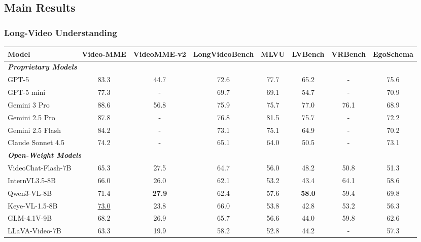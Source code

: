 \documentclass[11pt, letterpaper]{template}
\theoremstyle{plain}
\theoremstyle{definition}
\theoremstyle{remark}
\begin{document}
\subsection{Main Results}
\subsubsection{Long-Video Understanding}

\begin{table}[t]
    \centering
\begin{adjustbox}{width=\linewidth,center}
\renewcommand{\arraystretch}{1.1}
\setlength{\tabcolsep}{1.5mm}
\begin{tabular}{lccccccc}
\toprule
\textbf{Model} & \textbf{Video-MME} & \textbf{VideoMME-v2} & \textbf{LongVideoBench} & \textbf{MLVU} & \textbf{LVBench} & \textbf{VRBench} & \textbf{EgoSchema} \\
\midrule
\multicolumn{8}{l}{\textbf{\textit{Proprietary Models}}} \\
GPT-5~\citep{gpt5} & 83.3 & 44.7 & 72.6 & 77.7 & 65.2 & - & 75.6 \\
GPT-5 mini~\citep{gpt5} & 77.3 & - & 69.7 & 69.1 & 54.7 & - & 70.9 \\
Gemini 3 Pro~\citep{gemini3pro} & 88.6 & 56.8 & 75.9 & 75.7 & 77.0 & 76.1 & 68.9 \\
Gemini 2.5 Pro~\citep{comanici2025gemini} & 87.8 & - & 76.8 & 81.5 & 75.7 & - & 72.2 \\
Gemini 2.5 Flash~\citep{comanici2025gemini} & 84.2 & - & 73.1 & 75.1 & 64.9 & - & 70.2 \\
Claude Sonnet 4.5~\citep{sonnet45} & 74.2 & - & 65.1 & 64.0 & 50.5 & - & 73.1 \\
\midrule
\multicolumn{8}{l}{\textbf{\textit{Open-Weight Models}}} \\
VideoChat-Flash-7B~\citep{li2024videochat} & 65.3 & 27.5 & 64.7 & 56.0 & 48.2 & 50.8 & 51.3 \\
InternVL3.5-8B~\citep{internvl35} & 66.0 & 26.0 & 62.1 & 53.2 & 43.4 & 64.1 & 58.6 \\
Qwen3-VL-8B~\citep{qwen3vl} & 71.4 & \textbf{27.9} & 62.4 & 57.6 & \textbf{58.0} & 59.4 & 69.8 \\
Keye-VL-1.5-8B~\citep{keyevl15} & \underline{73.0} & 23.8 & 66.0 & 53.8 & 42.8 & 53.2 & 56.3 \\
GLM-4.1V-9B~\citep{hong2025glm} & 68.2 & 26.9 & 65.7 & 56.6 & 44.0 & 59.8 & 62.6 \\
LLaVA-Video-7B~\citep{zhang2024llava} & 63.3 & 19.9 & 58.2 & 52.8 & 44.2 & - & 57.3 \\

\end{tabular}
\end{adjustbox}
\end{table}
\end{document}
